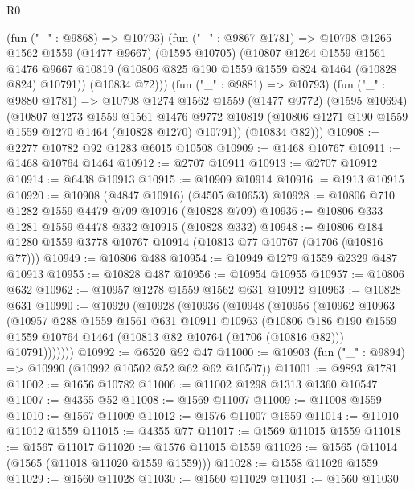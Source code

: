 \begin{lexlean}{R0}
\begin{coremodule}
        (fun ("_" : @9868) => @10793)
        (fun ("_" : @9867 @1781) =>
        @10798
          @1265
          @1562
          @1559
          (@1477 @9667)
          (@1595 @10705)
          (@10807
            @1264
            @1559
            @1561
            @1476
            @9667
            @10819
            (@10806 @825 @190 @1559 @1559 @824 @1464 (@10828 @824) @10791))
          (@10834 @72)))
      (fun ("_" : @9881) => @10793)
      (fun ("_" : @9880 @1781) =>
      @10798
        @1274
        @1562
        @1559
        (@1477 @9772)
        (@1595 @10694)
        (@10807
          @1273
          @1559
          @1561
          @1476
          @9772
          @10819
          (@10806 @1271 @190 @1559 @1559 @1270 @1464 (@10828 @1270) @10791))
        (@10834 @82)))
@10908 := @2277 @10782 @92 @1283 @6015 @10508
@10909 := @1468 @10767
@10911 := @1468 @10764 @1464
@10912 := @2707 @10911
@10913 := @2707 @10912
@10914 := @6438 @10913
@10915 := @10909 @10914
@10916 := @1913 @10915
@10920 := @10908 (@4847 @10916) (@4505 @10653)
@10928 := @10806 @710 @1282 @1559 @4479 @709 @10916 (@10828 @709)
@10936 := @10806 @333 @1281 @1559 @4478 @332 @10915 (@10828 @332)
@10948 := @10806 @184 @1280 @1559 @3778 @10767 @10914 (@10813 @77 @10767 (@1706 (@10816 @77)))
@10949 := @10806 @488
@10954 := @10949 @1279 @1559 @2329 @487 @10913
@10955 := @10828 @487
@10956 := @10954 @10955
@10957 := @10806 @632
@10962 := @10957 @1278 @1559 @1562 @631 @10912
@10963 := @10828 @631
@10990 := @10920
    (@10928
      (@10936
        (@10948
          (@10956
            (@10962
              @10963
              (@10957
                @288
                @1559
                @1561
                @631
                @10911
                @10963
                (@10806
                  @186
                  @190
                  @1559
                  @1559
                  @10764
                  @1464
                  (@10813 @82 @10764 (@1706 (@10816 @82)))
                  @10791)))))))
@10992 := @6520 @92 @47
@11000 := @10903 (fun ("_" : @9894) => @10990 (@10992 @10502 @52 @62 @62 @10507))
@11001 := @9893 @1781
@11002 := @1656 @10782
@11006 := @11002 @1298 @1313 @1360 @10547
@11007 := @4355 @52
@11008 := @1569 @11007
@11009 := @11008 @1559
@11010 := @1567 @11009
@11012 := @1576 @11007 @1559
@11014 := @11010 @11012 @1559
@11015 := @4355 @77
@11017 := @1569 @11015 @1559
@11018 := @1567 @11017
@11020 := @1576 @11015 @1559
@11026 := @1565 (@11014 (@1565 (@11018 @11020 @1559 @1559)))
@11028 := @1558 @11026 @1559
@11029 := @1560 @11028
@11030 := @1560 @11029
@11031 := @1560 @11030

\end{coremodule}
\end{lexlean}
